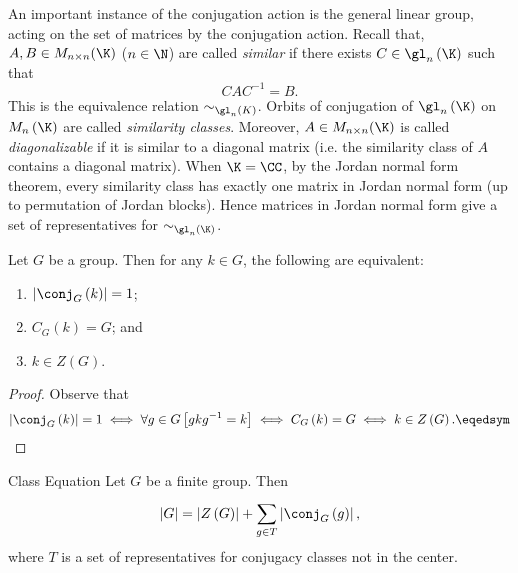 \documentclass[pmath347]{subfiles}
\begin{document}
    \ex An important instance of the conjugation action is the general linear group, acting on the set of matrices by the conjugation action. Recall that, $A,B\in M_{n\times n}(\K)$ ($n\in\N$) are called \emph{similar} if there exists $C\in\gl_n\left( \K \right)$ such that 
    \begin{equation*}
        CAC^{-1} = B.
    \end{equation*}
    This is the equivalence relation $\sim_{\gl_n\left( K \right) }$. Orbits of conjugation of $\gl_n\left( \K \right)$ on $M_n\left( \K \right)$ are called \emph{similarity classes}. Moreover, $A\in M_{n\times n}(\K)$ is called \emph{diagonalizable} if it is similar to a diagonal matrix (i.e. the similarity class of $A$ contains a diagonal matrix). When $\K=\CC$, by the Jordan normal form theorem, every similarity class has exactly one matrix in Jordan normal form (up to permutation of Jordan blocks). Hence matrices in Jordan normal form give a set of representatives for $\sim_{\gl_n\left( \K \right) }$. 

    \clearpage
    \begin{prop}{}
        Let $G$ be a group. Then for any $k\in G$, the following are equivalent:
        \begin{enumerate}
            \item $\left| \conj_G\left( k \right)  \right| = 1$;
            \item $C_G\left( k \right) = G$; and
            \item $k\in Z\left( G \right)$.
        \end{enumerate}
    \end{prop}

    \begin{proof}
        Observe that
        \begin{equation*}
            \left| \conj_G\left( k \right)  \right| = 1 \iff \forall g\in G\left[ gkg^{-1} = k \right] \iff C_G\left( k \right) = G \iff k\in Z\left( G \right) . \eqedsym
        \end{equation*}
    \end{proof}

    \begin{theorem}{Class Equation}
        Let $G$ be a finite group. Then
        \begin{equation*}
            \left| G \right| = \left| Z\left( G \right)  \right| + \sum^{}_{g\in T} \left| \conj_G\left( g \right)  \right| ,
        \end{equation*}
        where $T$ is a set of representatives for conjugacy classes not in the center.
    \end{theorem}
\end{document}
